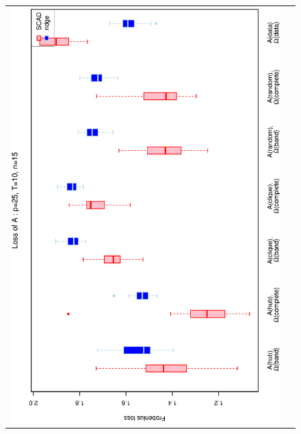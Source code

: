 \documentclass[a4paper]{article}
\begin{document}
\begin{figure}[h!]
\centering
\begin{tabular}{cc}
\includegraphics[scale=0.45,angle=270]{LossA25T10N15_5.eps}
\\

\end{tabular}
\end{figure}
\end{document}
